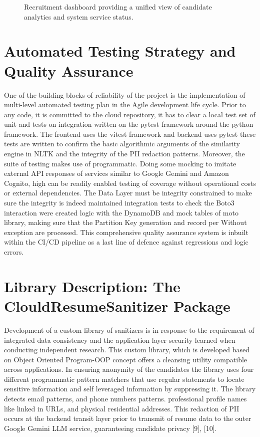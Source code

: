 \documentclass[conference]{IEEEtran}
\begin{document}
\begin{figure}[htbp]
\centering
{}
\caption{Recruitment dashboard providing a unified view of candidate analytics and system service status.}
\label{fig:dashboard}
\end{figure}

\section{Automated Testing Strategy and Quality Assurance}
One of the building blocks of reliability of the project is the implementation of multi-level automated testing plan in the Agile development life cycle. Prior to any code, it is committed to the cloud repository, it has to clear a local test set of unit and tests on integration written on the pytest framework around the python framework. The frontend uses the vitest framework and backend uses pytest these tests are written to confirm the basic algorithmic arguments of the similarity engine in NLTK and the integrity of the PII redaction patterns. Moreover, the suite of testing makes use of programmatic. Doing some mocking to imitate external API responses of services similar to Google Gemini and Amazon Cognito, high can be readily enabled testing of coverage without operational costs or external dependencies. The Data Layer must be integrity constrained to make sure the integrity is indeed maintained integration tests to check the Boto3 interaction were created logic with the DynamoDB and mock tables of moto library, making sure that the Partition Key generation and record per Without exception are processed. This comprehensive quality assurance system is inbuilt within the CI/CD pipeline as a last line of defence against regressions and logic errors.

\section{Library Description: The ClouldResumeSanitizer Package}
Development of a custom library of sanitizers is in response to the requirement of integrated data consistency and the application layer security learned when conducting independent research. This custom library, which is developed based on Object Oriented Program-OOP concept offers a cleansing utility compatible across applications. In ensuring anonymity of the candidates the library uses four different programmatic pattern matchers that use regular statements to locate sensitive information and self leveraged information by suppressing it. The library detects email patterns, and phone numbers patterns. professional profile names like linked in URLs, and physical residential addresses. This redaction of PII occurs at the backend transit layer prior to transmit of resume data to the outer Google Gemini LLM service, guaranteeing candidate privacy [9], [10].
\end{document}
